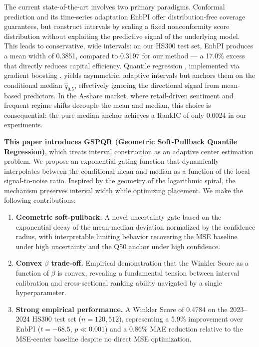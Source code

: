 \documentclass[12pt, a4paper]{article}
\begin{document}
The current state-of-the-art involves two primary paradigms. Conformal prediction
\citep{vovk2005} and its time-series adaptation EnbPI \citep{xu2021} offer
distribution-free coverage guarantees, but construct intervals by scaling a fixed
nonconformity score distribution without exploiting the predictive signal of the
underlying model. This leads to conservative, wide intervals: on our HS300 test set,
EnbPI produces a mean width of 0.3851, compared to 0.3197 for our method --- a 17.0\%
excess that directly reduces capital efficiency. Quantile regression
\citep{koenker1978}, implemented via gradient boosting \citep{ke2017}, yields
asymmetric, adaptive intervals but anchors them on the conditional median
$\hat{q}_{0.5}$, effectively ignoring the directional signal from mean-based predictors.
In the A-share market, where retail-driven sentiment and frequent regime shifts decouple
the mean and median, this choice is consequential: the pure median anchor achieves a
RankIC of only 0.0024 in our experiments.

\textbf{This paper introduces GSPQR (Geometric Soft-Pullback Quantile Regression)},
which treats interval construction as an adaptive center estimation problem. We propose
an exponential gating function that dynamically interpolates between the conditional
mean and median as a function of the local signal-to-noise ratio. Inspired by the
geometry of the logarithmic spiral, the mechanism preserves interval width while
optimizing placement. We make the following contributions:

\begin{enumerate}
    \item \textbf{Geometric soft-pullback.} A novel uncertainty gate based on the
    exponential decay of the mean-median deviation normalized by the confidence radius,
    with interpretable limiting behavior recovering the MSE baseline under high
    uncertainty and the Q50 anchor under high confidence.

    \item \textbf{Convex $\beta$ trade-off.} Empirical demonstration that the Winkler
    Score as a function of $\beta$ is convex, revealing a fundamental tension between
    interval calibration and cross-sectional ranking ability navigated by a single
    hyperparameter.

    \item \textbf{Strong empirical performance.} A Winkler Score of 0.4784 on the
    2023--2024 HS300 test set ($n = 120{,}512$), representing a 5.9\% improvement over
    EnbPI ($t = -68.5$, $p \ll 0.001$) and a 0.86\% MAE reduction relative to the
    MSE-center baseline despite no direct MSE optimization.
\end{enumerate}
\end{document}
